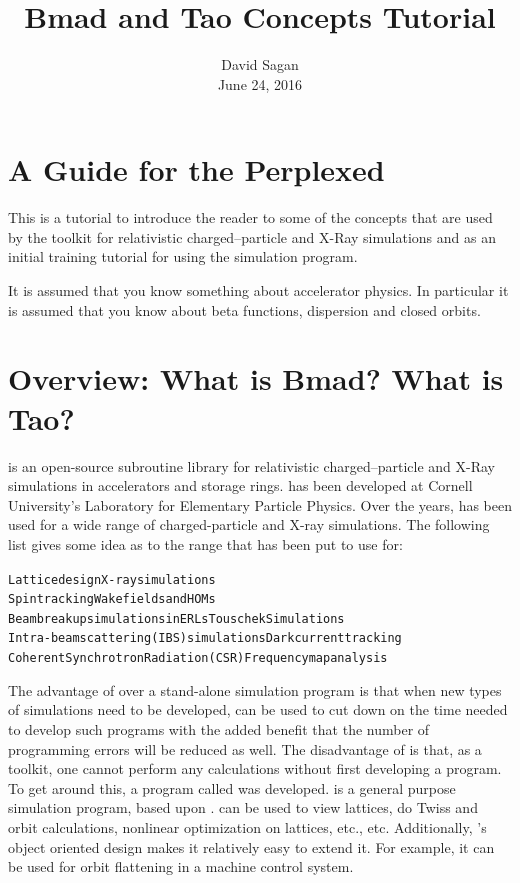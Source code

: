 \documentclass{hitec}
\title{Bmad and Tao Concepts Tutorial}
\author{}
\date{David Sagan \\ June 24, 2016}
\newcommand{\Section}[1]{\section{#1}\vspace*{-1ex}}
\newenvironment{display}
  {\vspace*{-1.5ex} \begin{alltt}}
  {\end{alltt} \vspace*{-1.0ex}}
\begin{document}
\maketitle

\tableofcontents

\Section{A Guide for the Perplexed}
\label{s:guide}

This is a tutorial to introduce the reader to some of the concepts that are used by the \bmad toolkit
for relativistic charged--particle and X-Ray simulations and as an initial training tutorial
for using the \tao simulation program.

It is assumed that you know something about accelerator physics. In particular it is assumed that
you know about beta functions, dispersion and closed orbits.

\Section{Overview: What is Bmad? What is Tao?}
\label{s:overview}

\bmad is an open-source subroutine library for relativistic charged--particle and X-Ray simulations
in accelerators and storage rings. \bmad has been developed at Cornell University's Laboratory for
Elementary Particle Physics.  Over the years, \bmad has been used for a wide range of
charged-particle and X-ray simulations. The following list gives some idea as to the range that
\bmad has been put to use for:
\begin{display}
  Lattice design                              X-ray simulations
  Spin tracking                               Wakefields and HOMs
  Beam breakup simulations in ERLs            Touschek Simulations
  Intra-beam scattering (IBS) simulations     Dark current tracking
  Coherent Synchrotron Radiation (CSR)        Frequency map analysis
\end{display}

The advantage of \bmad over a stand-alone simulation program is that when new types of simulations
need to be developed, \bmad can be used to cut down on the time needed to develop such programs
with the added benefit that the number of programming errors will be reduced
as well. The disadvantage of \bmad is that, as a toolkit, one cannot perform any calculations
without first developing a program. To get around this, a program called \tao was developed.
\tao is a general purpose simulation program, based upon \bmad. \tao can be used to view
lattices, do Twiss and orbit calculations, nonlinear optimization on lattices, etc., etc.
Additionally, \tao's object oriented design makes it relatively easy to extend it. For
example, it can be used for orbit flattening in a machine control system.
\end{document}
